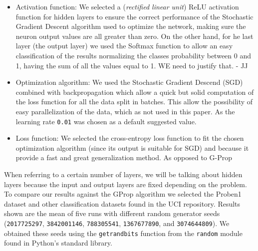 \documentclass[runningheads]{llncs}
\begin{document}
\begin{itemize}

\item Activation function: We selected a (\emph{rectified linear unit}) ReLU
  activation function for hidden layers to ensure the correct performance of
  the Stochastic Gradient Descent algorithm used to optimize the network,
  making sure the neuron output values are all greater than zero.  On the other
  hand, for he last layer (the output layer) we used the Softmax function to
  allow an easy classification of the results normalizing the classes
  probability between 0 and 1, having the sum of all the values equal to 1. %
  WE need to justify that. - JJ

\item Optimization algorithm: We used the Stochastic Gradient Descend
  (SGD) combined with backpropagation which allow a quick but solid computation
  of the loss function for all the data split in batches. This allow the
  possibility of easy parallelization of the data, which as not used in this
  paper. As the learning rate \texttt{0.01} was chosen as a default suggested
  value.

\item Loss function: We selected the cross-entropy loss function to fit the
  chosen optimization algorithm (since its output is suitable for SGD) and
  because it provide a fast and great generalization method. As opposed to
  G-Prop

\end{itemize}

When referring to a certain number of layers, we will be talking about hidden
layers because the input and output layers are fixed depending on the problem.
To compare our results against the GProp algorithm we selected the Proben1
\cite{Proben1} dataset and other classification datasets found in the UCI
\cite{uci} repository. Results shown are the mean of five runs with different
random generator seeds (\texttt{2017725297}, \texttt{3842001146},
\texttt{788305541}, \texttt{1367677890}, and \texttt{3074644809}). We obtained
these seeds using the \texttt{getrandbits} function from the \texttt{random}
module found in Python's standard library.

\end{document}
